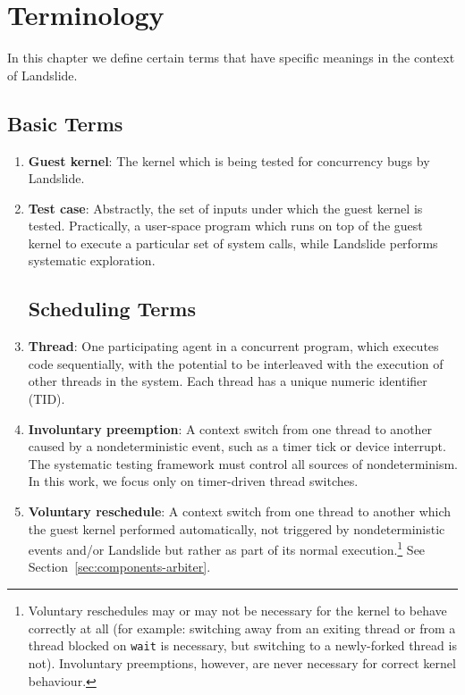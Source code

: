 \chapter{Terminology}

In this chapter we define certain terms that have specific meanings in the context of Landslide.

\section{Basic Terms}

\begin{enumerate}
	\item {\bf Guest kernel}:
		The kernel which is being tested for concurrency bugs by Landslide.
	\item {\bf Test case}:
		Abstractly, the set of inputs under which the guest kernel is tested. Practically, a user-space program which runs on top of the guest kernel to execute a particular set of system calls, while Landslide performs systematic exploration.

\section{Scheduling Terms}


	\item {\bf Thread}:
		One participating agent in a concurrent program, which executes code sequentially, with the potential to be interleaved with the execution of other threads in the system.
		Each thread has a unique numeric identifier (TID).
	\item {\bf Involuntary preemption}:
		A context switch from one thread to another caused by a nondeterministic event, such as a timer tick or device interrupt. The systematic testing framework must control all sources of nondeterminism. In this work, we focus only on timer-driven thread switches.
	\item {\bf Voluntary reschedule}:
		A context switch from one thread to another which the guest kernel performed automatically, not triggered by nondeterministic events and/or Landslide but rather as part of its normal execution.\footnote{
		Voluntary reschedules may or may not be necessary for the kernel to behave correctly at all (for example: switching away from an exiting thread or from a thread blocked on \texttt{wait} is necessary, but switching to a newly-forked thread is not). Involuntary preemptions, however, are never necessary for correct kernel behaviour.}
		See Section~\ref{sec:components-arbiter}.


\end{enumerate}
